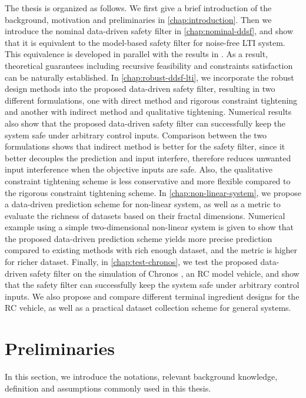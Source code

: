 The thesis is organized as follows.
We first give a brief introduction of the background, motivation and preliminaries in \cref{chap:introduction}.
Then we introduce the nominal data-driven safety filter in \cref{chap:nominal-ddsf}, and show that it is equivalent to the model-based safety filter for noise-free LTI system.
This equivalence is developed in parallel with the results in \cite{bajelaniDataDrivenSafetyFilter2023}.
As a result, theoretical guarantees including recursive feasibility and constraints satisfaction can be naturally established.
In \cref{chap:robust-ddsf-lti}, we incorporate the robust design methods into the proposed data-driven safety filter, resulting in two different formulations, one with direct method and rigorous constraint tightening and another with indirect method and qualitative tightening.
Numerical results also show that the proposed data-driven safety filter can successfully keep the system safe under arbitrary control inputs.
Comparison between the two formulations shows that indirect method is better for the safety filter, since it better decouples the prediction and input interfere, therefore reduces unwanted input interference when the objective inputs are safe.
Also, the qualitative constraint tightening scheme is less conservative and more flexible compared to the rigorous constraint tightening scheme.
In \cref{chap:non-linear-system}, we propose a data-driven prediction scheme for non-linear system, as well as a metric to evaluate the richness of datasets based on their fractal dimensions.
Numerical example using a simple two-dimensional non-linear system is given to show that the proposed data-driven prediction scheme yields more precise prediction compared to existing methods with rich enough dataset, and the metric is higher for richer dataset.
Finally, in \cref{chap:test-chronos}, we test the proposed data-driven safety filter on the simulation of Chronos \cite{carronChronosCRSDesign2022}, an RC model vehicle, and show that the safety filter can successfully keep the system safe under arbitrary control inputs.
We also propose and compare different terminal ingredient designs for the RC vehicle, as well as a practical dataset collection scheme for general systems.


\section{Preliminaries}\label{sec:preliminaries}

In this section, we introduce the notations, relevant background knowledge, definition and assumptions commonly used in this thesis.

